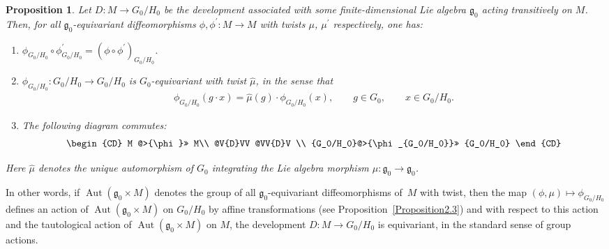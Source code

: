 \documentclass[11pt]{article}
\DeclareMathOperator{\automorphism}{Aut}
\numberwithin{equation}{section}
\newtheorem{PropositionBlaom}[TheoremBlaom]{Proposition}
 { \theoremstyle{definition}
\newtheorem{CounterexampleBlaom}[TheoremBlaom]{Counterexample}
\newtheorem{RemarkBlaom}[TheoremBlaom]{Remark} }
\begin{document}
\begin{PropositionBlaom}\label{Proposition4.7} Let $D \colon M \rightarrow {G_0/H_0}$ be the
  development associated with some finite-di\-men\-sio\-nal Lie algebra
  ${\mathfrak g}_0$ acting transitively on $M$. Then, for all
  ${\mathfrak g}_0$-equivariant diffeomorphisms $\phi,\phi^\prime
  \colon M \rightarrow M$ with twists $\mu$, $\mu^\prime$ respectively,
  one has:
  \begin{enumerate}\itemsep=0pt
  \item[$(1)$] %
  $\phi_{G_0/H_0} \circ \phi^\prime_{G_0/H_0}=(\phi \circ
    \phi^\prime)_{G_0/H_0}$.

  \item[$(2)$] %
  $\phi_{G_0/H_0} \colon {G_0/H_0} \rightarrow
    {G_0/H_0} $ is $G_0$-equivariant with twist $\hat\mu$, in the
    sense that
  \begin{gather*}
    \phi_{G_0/H_0}(g\cdot x)=\hat\mu(g)\cdot \phi_{G_0/H_0}(x), \qquad g
    \in G_0,\qquad x \in {G_0/H_0}.
  \end{gather*}

  \item[$(3)$] %
  The following diagram commutes:
    \begin{gather*}
      \begin{CD}
          M   @>{\phi}>> M\\
          @V{D}VV @VV{D}V \\
          {G_0/H_0}@>{\phi_{G_0/H_0}}>> {G_0/H_0}
        \end{CD}
    \end{gather*}
  \end{enumerate}
   Here $\hat \mu$ denotes the unique automorphism of $G_0$
   integrating the Lie algebra morphism $\mu \colon {\mathfrak g}_0
   \rightarrow {\mathfrak g}_0$.
 \end{PropositionBlaom}

 In other words, if $\automorphism({\mathfrak g}_0 \times M)$ denotes
 the group of all ${\mathfrak g}_0$-equivariant dif\/feomorphisms of~$M$
 with twist, then the map $(\phi,\mu) \mapsto \phi_{G_0/H_0}$ def\/ines
 an action of $\automorphism({\mathfrak g}_0 \times M)$ on ${G_0/H_0}$
 by af\/f\/ine transformations (see Proposition~\ref{Proposition2.3}) %
 and with
 respect to this action and the tautological action of
 $\automorphism({\mathfrak g}_0 \times M)$ on $M$, the development $D
 \colon M \rightarrow {G_0/H_0}$ is equivariant, in the standard sense
 of group actions.
\end{document}
